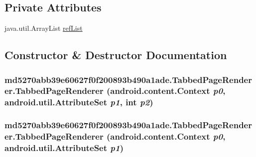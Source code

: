 \subsection*{Private Attributes}
\begin{CompactItemize}
\item 
java.util.ArrayList \hyperlink{classmd5270abb39e60627f0f200893b490a1ade_1_1_tabbed_page_renderer_68463cfbc83b39600752261e37af0f3d}{refList}
\end{CompactItemize}


\subsection{Constructor \& Destructor Documentation}
\hypertarget{classmd5270abb39e60627f0f200893b490a1ade_1_1_tabbed_page_renderer_29adb24329fe37a1044a6c6e485282a5}{
\subsubsection[{TabbedPageRenderer}]{\setlength{\rightskip}{0pt plus 5cm}md5270abb39e60627f0f200893b490a1ade.TabbedPageRenderer.TabbedPageRenderer (android.content.Context {\em p0}, \/  android.util.AttributeSet {\em p1}, \/  int {\em p2})}}
\label{classmd5270abb39e60627f0f200893b490a1ade_1_1_tabbed_page_renderer_29adb24329fe37a1044a6c6e485282a5}


\hypertarget{classmd5270abb39e60627f0f200893b490a1ade_1_1_tabbed_page_renderer_a9ac414c6055675bf9eff78fe6f0672e}{
\subsubsection[{TabbedPageRenderer}]{\setlength{\rightskip}{0pt plus 5cm}md5270abb39e60627f0f200893b490a1ade.TabbedPageRenderer.TabbedPageRenderer (android.content.Context {\em p0}, \/  android.util.AttributeSet {\em p1})}}
\label{classmd5270abb39e60627f0f200893b490a1ade_1_1_tabbed_page_renderer_a9ac414c6055675bf9eff78fe6f0672e}



